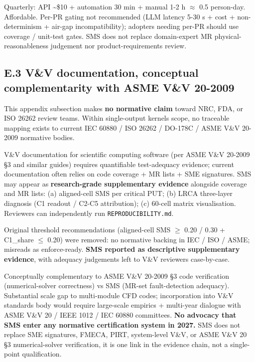 \documentclass[manuscript,screen,review]{acmart}
\begin{document}
Quarterly: API \textasciitilde\$10 + automation 30 min + manual 1-2 h $\approx$
0.5 person-day. Affordable. Per-PR gating not recommended (LLM latency
5-30 s + cost + non-determinism + air-gap incompatibility); adopters
needing per-PR should use coverage / unit-test gates. SMS does not
replace domain-expert MR physical-reasonableness judgement nor
product-requirements review.

\subsection{E.3 V\&V documentation, conceptual complementarity with ASME V\&V 20-2009}\label{e.3-vv-documentation-conceptual-complementarity-with-asme-vv-20-2009}

This appendix subsection makes \textbf{no normative claim} toward NRC,
FDA, or ISO 26262 review teams. Within single-output kernels scope, no
traceable mapping exists to current IEC 60880 / ISO 26262 / DO-178C /
ASME V\&V 20-2009 normative bodies.

V\&V documentation for scientific computing software (per ASME V\&V
20-2009 §3 and similar guides) requires quantifiable test-adequacy
evidence; current documentation often relies on code coverage + MR lists
+ SME signatures. SMS may appear as \textbf{research-grade supplementary
evidence} alongside coverage and MR lists: (a) aligned-cell SMS per
critical PUT; (b) LRCA three-layer diagnosis (C1 readout / C2-C5
attribution); (c) 60-cell matrix visualisation. Reviewers can
independently run \texttt{REPRODUCIBILITY.md}.

Original threshold recommendations (aligned-cell SMS $\geq$ 0.20 / 0.30 +
C1\_share $\leq$ 0.20) were removed: no normative backing in IEC / ISO /
ASME; misreads as enforce-ready. \textbf{SMS reported as descriptive
supplementary evidence}, with adequacy judgements left to V\&V reviewers
case-by-case.

Conceptually complementary to ASME V\&V 20-2009 §3 code verification
(numerical-solver correctness) vs SMS (MR-set fault-detection adequacy).
Substantial scale gap to multi-module CFD codes; incorporation into V\&V
standards body would require large-scale empirics + multi-year
dialogue with ASME V\&V 20 / IEEE 1012 / IEC 60880 committees.
\textbf{No advocacy that SMS enter any normative certification system in
2027.} SMS does not replace SME signatures, FMECA, PIRT, system-level
V\&V, or ASME V\&V 20 §3 numerical-solver verification, it is one
link in the evidence chain, not a single-point qualification.
\end{document}
